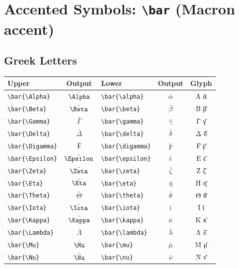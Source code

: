 \documentclass[12pt,a4paper]{article}
\begin{document}
\section*{Accented Symbols: \texttt{\textbackslash bar} (Macron accent)}

\subsection*{Greek Letters}
\begin{longtable}{|l|c|l|c|c|}
\hline
\textbf{Upper}           & \textbf{Output}  & \textbf{Lower}           & \textbf{Output}     & \textbf{Glyph} \\
\hline
\verb|\bar{\Alpha}|      & $\bar{\Alpha}$   & \verb|\bar{\alpha}|      & $\bar{\alpha}$      & Ᾱ ᾱ \\
\verb|\bar{\Beta}|       & $\bar{\Beta}$    & \verb|\bar{\beta}|       & $\bar{\beta}$       & Β̄ β̄ \\
\verb|\bar{\Gamma}|      & $\bar{\Gamma}$   & \verb|\bar{\gamma}|      & $\bar{\gamma}$      & Γ̄ γ̄ \\
\verb|\bar{\Delta}|      & $\bar{\Delta}$   & \verb|\bar{\delta}|      & $\bar{\delta}$      & Δ̄ δ̄ \\
\verb|\bar{\Digamma}|    & $\bar{\Digamma}$ & \verb|\bar{\digamma}|    & $\bar{\digamma}$    & Ϝ̄ ϝ̄ \\
\verb|\bar{\Epsilon}|    & $\bar{\Epsilon}$ & \verb|\bar{\epsilon}|    & $\bar{\epsilon}$    & Ε̄ ϵ̄ \\
\verb|\bar{\Zeta}|       & $\bar{\Zeta}$    & \verb|\bar{\zeta}|       & $\bar{\zeta}$       & Ζ̄ ζ̄ \\
\verb|\bar{\Eta}|        & $\bar{\Eta}$     & \verb|\bar{\eta}|        & $\bar{\eta}$        & Η̄ η̄ \\
\verb|\bar{\Theta}|      & $\bar{\Theta}$   & \verb|\bar{\theta}|      & $\bar{\theta}$      & Θ̄ θ̄ \\
\verb|\bar{\Iota}|       & $\bar{\Iota}$    & \verb|\bar{\iota}|       & $\bar{\iota}$       & Ῑ ῑ \\
\verb|\bar{\Kappa}|      & $\bar{\Kappa}$   & \verb|\bar{\kappa}|      & $\bar{\kappa}$      & Κ̄ κ̄ \\
\verb|\bar{\Lambda}|     & $\bar{\Lambda}$  & \verb|\bar{\lambda}|     & $\bar{\lambda}$     & Λ̄ λ̄ \\
\verb|\bar{\Mu}|         & $\bar{\Mu}$      & \verb|\bar{\mu}|         & $\bar{\mu}$         & Μ̄ μ̄ \\
\verb|\bar{\Nu}|         & $\bar{\Nu}$      & \verb|\bar{\nu}|         & $\bar{\nu}$         & Ν̄ ν̄ \\

\end{longtable}
\end{document}
